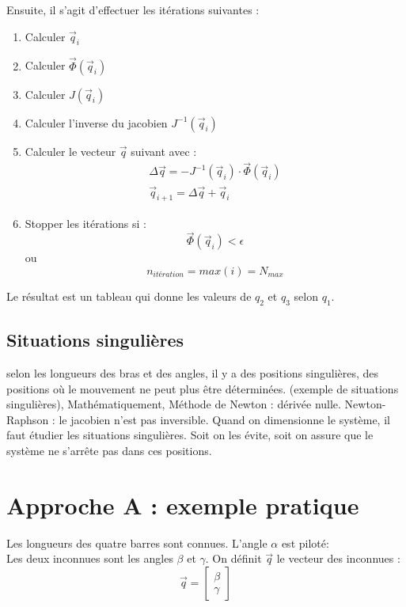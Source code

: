 \documentclass[12pt,a4paper]{article}
\begin{document}
Ensuite, il s'agit d'effectuer les itérations suivantes : 
\begin{enumerate}
	\item Calculer $\vec{q}_{i}$
	\item Calculer $\vec{\Phi}(\vec{q}_{i})$
	\item Calculer $J(\vec{q}_{i})$
	\item Calculer l'inverse du jacobien $J^{-1}(\vec{q}_{i})$
	\item Calculer le vecteur $\vec{q}$ suivant avec : 
	\begin{eqnarray}
	\Delta \vec{q} = -J^{-1}(\vec{q}_i) \cdot \vec{\Phi}(\vec{q}_i)\\
	\vec{q}_{i+1}=\Delta \vec{q}+\vec{q}_{i}
	\end{eqnarray}
	\item Stopper les itérations si :
\begin{equation}
\vec{\Phi}(\vec{q}_{i}) < \epsilon
\end{equation}
ou 
\begin{equation}
n_{itération}=max(i)=N_{max}
\end{equation}
\end{enumerate}

Le résultat est un tableau qui donne les valeurs de $q_2$ et $q_3$ selon $q_1$.

\subsection{Situations singulières}
selon les longueurs des bras et des angles, il y a des positions singulières, des positions où le mouvement ne peut plus être déterminées. (exemple de situations singulières), 
Mathématiquement, Méthode de Newton : dérivée nulle. Newton-Raphson : le jacobien n'est pas inversible. 
\medbreak
Quand on dimensionne le système, il faut étudier les situations singulières. Soit on les évite, soit on assure que le système ne s'arrête pas dans ces positions. 
\section{Approche A : exemple pratique}
Les longueurs des quatre barres sont connues. L'angle $\alpha$ est piloté:  \\
Les deux inconnues sont les angles $\beta$ et $\gamma$. On définit $\vec{q}$ le vecteur des inconnues :
\begin{equation}
\vec{q}=\begin{bmatrix}
\beta\\
\gamma
\end{bmatrix}
\end{equation}
\end{document}
